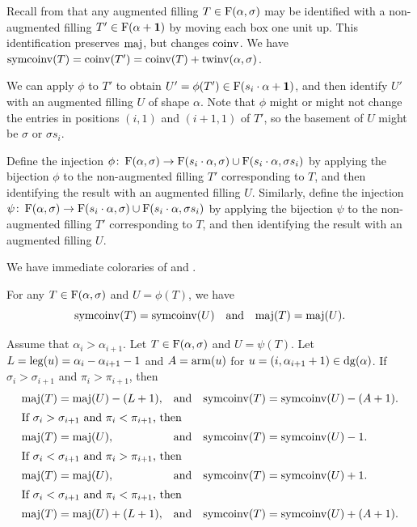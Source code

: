 Recall from  that any augmented filling \(T \in \Fill(\alpha, \sigma)\) may be identified with a non-augmented filling \(T' \in \Fill(\alpha + \mathbf{1})\) by moving each box one unit up.
This identification preserves \(\maj\), but changes \(\coinv\).
We have \(\symcoinv(T) = \coinv(T') = \coinv(T) + \twinv(\alpha, \sigma)\).

We can apply \(\phi\) to \(T'\) to obtain \(U' = \phi(T') \in \Fill(s_i \permact \alpha + \mathbf{1})\), and then identify \(U'\) with an augmented filling \(U\) of shape \(\alpha\).
Note that \(\phi\) might or might not change the entries in positions \((i,1)\) and \((i+1,1)\) of \(T'\),
so the basement of \(U\) might be \(\sigma\) or \(\sigma s_i\).

Define the injection \(\phi \colon \Fill(\alpha, \sigma) \to \Fill(s_i \permact \alpha, \sigma) \cup \Fill(s_i \permact \alpha, \sigma s_i)\) by applying the bijection \(\phi\) to the non-augmented filling \(T'\) corresponding to \(T\), and then identifying the result with an augmented filling \(U\).
Similarly, define the injection \(\psi \colon \Fill(\alpha, \sigma) \to \Fill(s_i \permact \alpha, \sigma) \cup \Fill(s_i \permact \alpha, \sigma s_i)\) by applying the bijection \(\psi\) to the non-augmented filling \(T'\) corresponding to \(T\), and then identifying the result with an augmented filling \(U\).

We have immediate coloraries of  and .
\begin{corollary} \label{cor:phi-symcoinv}
    For any \(T \in \Fill(\alpha, \sigma)\) and \(U = \phi(T)\), we have
    \begin{equation*}
        \symcoinv(T) = \symcoinv(U)
        \quad \text{and} \quad
        \maj(T) = \maj(U).
    \end{equation*}
\end{corollary}

\begin{corollary} \label{cor:psi-symcoinv}
    Assume that \(\alpha_i > \alpha_{i+1}\).
    Let \(T \in \Fill(\alpha, \sigma)\) and \(U = \psi(T)\).
    Let \(L = \operatorname{leg}(u) = \alpha_i - \alpha_{i+1} - 1\) and \(A = \operatorname{arm}(u)\) for \(u = (i, \alpha_{i+1} + 1) \in \dg(\alpha)\).
    If \(\sigma_i > \sigma_{i+1}\) and \(\pi_i > \pi_{i+1}\), then
    \begin{align*}
        \maj(T) &= \maj(U) - (L+1), &&\text{and}&
        \symcoinv(T) &= \symcoinv(U) - (A+1). \\
    \intertext{If \(\sigma_i > \sigma_{i+1}\) and \(\pi_i < \pi_{i+1}\), then}
        \maj(T) &= \maj(U), &&\text{and}&
        \symcoinv(T) &= \symcoinv(U) - 1. \\
    \intertext{If \(\sigma_i < \sigma_{i+1}\) and \(\pi_i > \pi_{i+1}\), then}
        \maj(T) &= \maj(U), &&\text{and}&
        \symcoinv(T) &= \symcoinv(U) + 1. \\
    \intertext{If \(\sigma_i < \sigma_{i+1}\) and \(\pi_i < \pi_{i+1}\), then}
        \maj(T) &= \maj(U) + (L+1), &&\text{and}&
        \symcoinv(T) &= \symcoinv(U) + (A+1).
    \end{align*}
\end{corollary}

